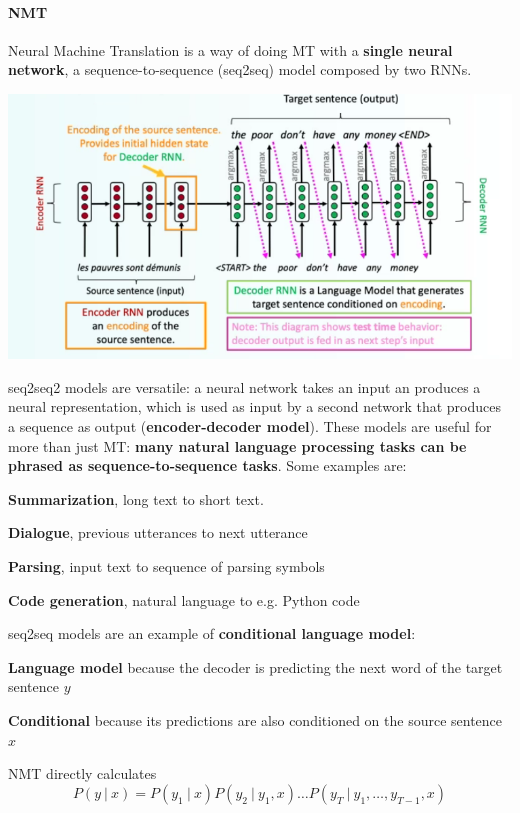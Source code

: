 \documentclass[10pt]{report}
\begin{document}
\paragraph{NMT} Neural Machine Translation is a way of doing MT with a \textbf{single neural network}, a sequence-to-sequence (seq2seq) model composed by two RNNs.
\begin{center}
	\includegraphics[scale=0.6]{63.png}
\end{center}
seq2seq2 models are versatile: a neural network takes an input an produces a neural representation, which is used as input by a second network that produces a sequence as output (\textbf{encoder-decoder model}). These models are useful for more than just MT: \textbf{many natural language processing tasks can be phrased as sequence-to-sequence tasks}. Some examples are:
\begin{list}{}{}
	\item \textbf{Summarization}, long text to short text.
	\item \textbf{Dialogue}, previous utterances to next utterance
	\item \textbf{Parsing}, input text to sequence of parsing symbols
	\item \textbf{Code generation}, natural language to e.g. Python code
\end{list}
seq2seq models are an example of \textbf{conditional language model}:\begin{list}{}{}
	\item \textbf{Language model} because the decoder is predicting the next word of the target sentence $y$
	\item \textbf{Conditional} because its predictions are also conditioned on the source sentence $x$
\end{list}
NMT directly calculates $$P(y\:|\:x) = P(y_1\:|\:x)P(y_2\:|\:y_1,x)\ldots P(y_T\:|\:y_1,\ldots,y_{T-1},x)$$
\end{document}
